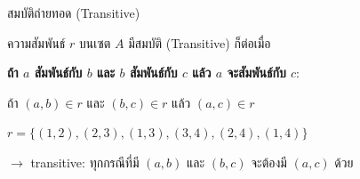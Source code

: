 \documentclass[11pt, aspectratio=169]{beamer}
\begin{document}
\begin{frame}{สมบัติถ่ายทอด (Transitive)}
  \begin{explanation}[นิยาม]
    ความสัมพันธ์ $r$ บนเซต $A$ มีสมบัติ  (Transitive) ก็ต่อเมื่อ

    \medskip
    \textbf{ถ้า $a$ สัมพันธ์กับ $b$ และ $b$ สัมพันธ์กับ $c$ แล้ว $a$ จะสัมพันธ์กับ $c$}:

    \medskip
    ถ้า $(a, b) \in r$ และ $(b, c) \in r$ แล้ว $(a, c) \in r$
  \end{explanation}

  \begin{exambox}[ตัวอย่าง]
    $r = \{(1,2), (2,3), (1,3), (3,4), (2,4), (1,4)\}$
    \par $\rightarrow$ transitive: ทุกกรณีที่มี $(a,b)$ และ $(b,c)$ จะต้องมี $(a,c)$ ด้วย
  \end{exambox}
\end{frame}
\end{document}
